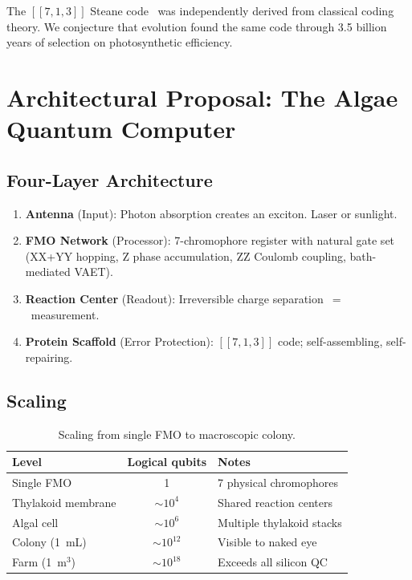 \documentclass[11pt,twocolumn]{article}
\begin{document}
The $[[7,1,3]]$ Steane code~\cite{Steane1996} was independently derived
from classical coding theory.  We conjecture that evolution found the
same code through 3.5 billion years of selection on photosynthetic
efficiency.

\section{Architectural Proposal: The Algae Quantum Computer}

\subsection{Four-Layer Architecture}

\begin{enumerate}
  \item[\textbf{L0}] \textbf{Antenna} (Input): Photon absorption
    creates an exciton.  Laser or sunlight.
  \item[\textbf{L1}] \textbf{FMO Network} (Processor): 7-chromophore
    register with natural gate set (XX+YY hopping, Z phase accumulation,
    ZZ Coulomb coupling, bath-mediated VAET).
  \item[\textbf{L2}] \textbf{Reaction Center} (Readout): Irreversible
    charge separation~$= $~measurement.
  \item[\textbf{L3}] \textbf{Protein Scaffold} (Error Protection):
    $[[7,1,3]]$ code; self-assembling, self-repairing.
\end{enumerate}

\subsection{Scaling}

\begin{table}[H]
\centering
\caption{Scaling from single FMO to macroscopic colony.}
\label{tab:scaling}
\begin{tabular}{@{}lcl@{}}
\toprule
Level & Logical qubits & Notes \\
\midrule
Single FMO & 1 & 7 physical chromophores \\
Thylakoid membrane & $\sim 10^4$ & Shared reaction centers \\
Algal cell & $\sim 10^6$ & Multiple thylakoid stacks \\
Colony (1~mL) & $\sim 10^{12}$ & Visible to naked eye \\
Farm (1~m$^3$) & $\sim 10^{18}$ & Exceeds all silicon QC \\
\bottomrule
\end{tabular}
\end{table}
\end{document}
